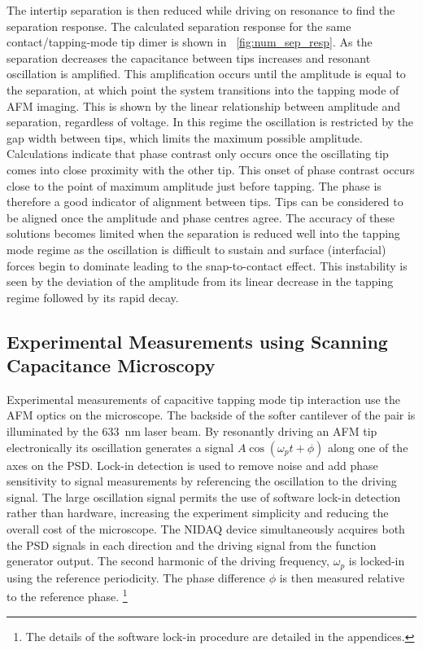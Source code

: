 \documentclass{article}
\begin{document}
The intertip separation is then reduced while driving on resonance to find the separation response. The calculated separation response for the same contact/tapping-mode tip dimer is shown in \figurename~\ref{fig:num_sep_resp}. As the separation decreases the capacitance between tips increases and resonant oscillation is amplified. This amplification occurs until the amplitude is equal to the separation, at which point the system transitions into the tapping mode of AFM imaging. This is shown by the linear relationship between amplitude and separation, regardless of voltage. In this regime the oscillation is restricted by the gap width between tips, which limits the maximum possible amplitude.
Calculations indicate that phase contrast only occurs once the oscillating tip comes into close proximity with the other tip. This onset of phase contrast occurs close to the point of maximum amplitude just before tapping. The phase is therefore a good indicator of alignment between tips. Tips can be considered to be aligned once the amplitude and phase centres agree. The accuracy of these solutions becomes limited when the separation is reduced well into the tapping mode regime as the oscillation is difficult to sustain and surface (interfacial) forces begin to dominate leading to the snap-to-contact effect. This instability is seen by the deviation of the amplitude from its linear decrease in the tapping regime followed by its rapid decay.

\FloatBarrier
\subsection{Experimental Measurements using Scanning Capacitance Microscopy}

Experimental measurements of capacitive tapping mode tip interaction use the AFM optics on the microscope. The backside of the softer cantilever of the pair is illuminated by the \SI{633}{nm} laser beam. By resonantly driving an AFM tip electronically its oscillation generates a signal $A\cos(\omega_p t + \phi)$ along one of the axes on the PSD. Lock-in detection is used to remove noise and add phase sensitivity to signal measurements by referencing the oscillation to the driving signal. The large oscillation signal permits the use of software lock-in detection rather than hardware, increasing the experiment simplicity and reducing the overall cost of the microscope. The NIDAQ device simultaneously acquires both the PSD signals in each direction and the driving signal from the function generator output. The second harmonic of the driving frequency, $\omega_p$ is locked-in using the reference periodicity. The phase difference $\phi$ is then measured relative to the reference phase.%
\footnote{The details of the software lock-in procedure are detailed in the appendices.}
\end{document}
